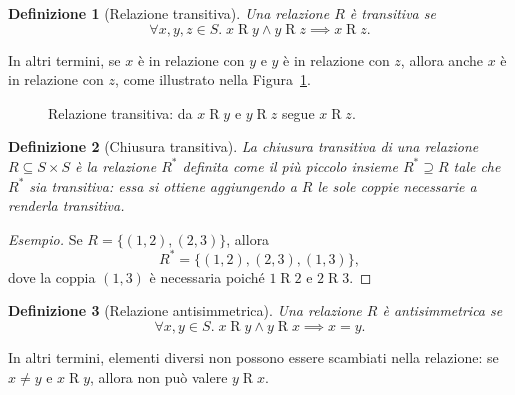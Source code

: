 \documentclass[a4paper, 11pt, oneside]{book}
\theoremstyle{formale}
\newtheorem*{definition}{Definizione}
\newenvironment{esempio}
    {\begin{proof}[\textit{Esempio}]\renewcommand{\qedsymbol}{$\diamond$}}
    {\end{proof}}
\begin{document}
    \begin{definition}[Relazione transitiva]
        Una relazione $R$ \`e \emph{transitiva} se
        \begin{equation*}
            \forall x, y, z \in S.\; x \mathrel{R} y \land y \mathrel{R} z \implies
            x \mathrel{R} z.
        \end{equation*}
    \end{definition}
    In altri termini, se $x$ \`e in relazione con $y$ e $y$ \`e in relazione con $z$, allora
    anche $x$ \`e in relazione con $z$, come illustrato nella Figura~\ref{fig:transitiva}.

    \begin{figure}[H]
        \centering
        \caption{Relazione transitiva: da $x \mathrel{R} y$ e $y \mathrel{R} z$ segue
            $x \mathrel{R} z$.}
        \label{fig:transitiva}
    \end{figure}

    \begin{definition}[Chiusura transitiva]
        La \emph{chiusura transitiva} di una relazione $R \subseteq S \times S$ \`e la
        relazione $R^*$ definita come il pi\`u piccolo insieme $R^* \supseteq R$ tale che
        $R^*$ sia transitiva: essa si ottiene aggiungendo a $R$ le sole coppie necessarie a
        renderla transitiva.
    \end{definition}

    \begin{esempio}
        Se $R = \{(1, 2), (2, 3)\}$, allora
        \begin{equation*}
            R^* = \{(1, 2), (2, 3), (1, 3)\},
        \end{equation*}
        dove la coppia $(1, 3)$ \`e necessaria poich\'e $1 \mathrel{R} 2$ e
        $2 \mathrel{R} 3$.
    \end{esempio}

    \begin{definition}[Relazione antisimmetrica]
        Una relazione $R$ \`e \emph{antisimmetrica} se
        \begin{equation*}
            \forall x, y \in S.\; x \mathrel{R} y \land y \mathrel{R} x \implies x = y.
        \end{equation*}
    \end{definition}
    In altri termini, elementi diversi non possono essere scambiati nella relazione: se
    $x \neq y$ e $x \mathrel{R} y$, allora non pu\`o valere $y \mathrel{R} x$.
\end{document}
